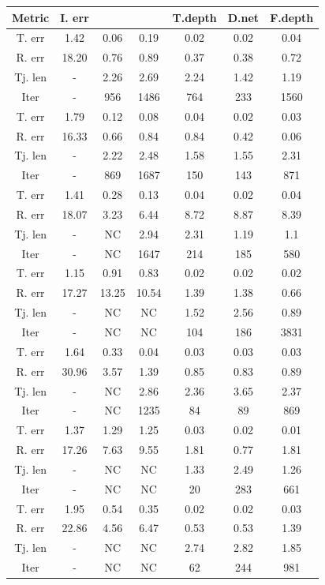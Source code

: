 \documentclass[letterpaper, 10 pt, conference]{ieeeconf}  %
\begin{document}
\begin{table}[h!]
\begin{center}
   \begin{tabular}{|c|c|c|c|c|c|c|}
\hline
Metric & I. err & \cite{photometricvs} & \cite{servonet} & T.depth & D.net & F.depth \\ \hline
\hline \hline
T. err &1.42 & 0.06 & 0.19 & 0.02 & 0.02 & 0.04 \\\hline
R. err & 18.20 & 0.76 & 0.89 & 0.37 & 0.38 & 0.72 \\  \hline
 Tj. len & - &2.26 & 2.69 &  2.24  &  1.42  &  1.19  \\ \hline
 Iter& - & 956 & 1486   &  764  &  233  &  1560  \\ \hline
\hline
T. err & 1.79 & 0.12 & 0.08 & 0.04 & 0.02 & 0.03 \\\hline
R. err & 16.33 & 0.66 & 0.84 & 0.84 & 0.42 & 0.06 \\  \hline
 Tj. len & - & 2.22 & 2.48  &  1.58  &  1.55  &  2.31  \\ \hline
 Iter& - & 869 &  1687  &  150  &  143  &  871  \\ \hline
\hline
T. err &1.41 & 0.28 & 0.13 & 0.04 & 0.02 & 0.04 \\\hline
R. err& 18.07 & 3.23 & 6.44 & 8.72 & 8.87 & 8.39 \\  \hline
 Tj. len &  - & NC & 2.94  &  2.31  &  1.19  &  1.1 \\ \hline
 Iter& - & NC & 1647  &  214  &  185  &  580  \\ \hline
\hline


\hline  \hline
T. err &1.15 & 0.91 & 0.83 & 0.02 & 0.02 & 0.02 \\ \hline
R. err& 17.27 & 13.25 & 10.54 & 1.39 & 1.38 & 0.66 \\  \hline
 Tj. len & - & NC & NC  &  1.52  &  2.56  &  0.89  \\ \hline
 Iter& - & NC & NC  &  104  &  186  &  3831  \\ \hline
 \hline
T. err &1.64 & 0.33 & 0.04 & 0.03 & 0.03 & 0.03 \\ \hline
R. err& 30.96 & 3.57 & 1.39 & 0.85 & 0.83 & 0.89 \\  \hline
 Tj. len & - & NC & 2.86  &  2.36  &  3.65  &  2.37 \\ \hline
 Iter&- & NC & 1235  &  84  &  89  &  869  \\ \hline
\hline
T. err &1.37 & 1.29 & 1.25 & 0.03 & 0.02 & 0.01 \\\hline
R. err& 17.26 & 7.63 & 9.55 & 1.81 & 0.77 & 1.81 \\  \hline
 Tj. len & - & NC & NC  &  1.33  &  2.49  &  1.26  \\ \hline
 Iter& - & NC & NC  &  20  &  283  &  661  \\ \hline
 \hline
T. err &1.95 & 0.54 & 0.35 & 0.02 & 0.02 & 0.03 \\ \hline
R. err& 22.86 & 4.56 & 6.47 & 0.53 & 0.53 & 1.39 \\  \hline
 Tj. len &- & NC & NC  &  2.74  &  2.82  &  1.85  \\ \hline
 Iter& - & NC & NC  &  62  &  244  &  981  \\ \hline
\hline


\end{tabular}
\end{center}
\end{table}
\end{document}
